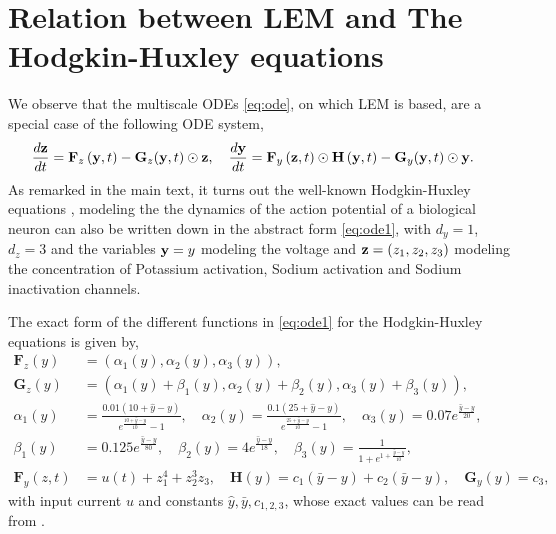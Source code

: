 \documentclass{article} \usepackage{iclr2022_conference,times}
\newcommand{\by}{{\bf y}}
\newcommand{\bz}{{\bf z}}
\begin{document}
\section{Relation between LEM and The Hodgkin-Huxley equations}
\label{app:HH}
We observe that the multiscale ODEs \eqref{eq:ode}, on which LEM is based, are a special case of the following ODE system,
\begin{equation}
    \label{eq:ode1}
    \begin{aligned}
    \frac{d\bz}{dt} &= {\mathbf{F}}_z\left(\by,t\right) - {\mathbf{G}}_z(\by,t)\odot \bz, \quad \frac{d\by}{dt} = {\mathbf{F}}_y\left(\bz,t\right)\odot{\mathbf{H}}\left(\by,t\right) - {\mathbf{G}}_y(\by,t)\odot \by.
    \end{aligned}
\end{equation}
As remarked in the main text, it turns out the well-known Hodgkin-Huxley equations \citet{HH}, modeling the the dynamics of the action potential of a biological neuron can also be written down in the abstract form \eqref{eq:ode1}, with $d_y = 1$, $d_z = 3$ and the variables $\by = y$ modeling the voltage and $\bz = (z_1,z_2,z_3)$ modeling the concentration of Potassium activation, Sodium activation and Sodium inactivation channels. 

The exact form of the different functions in \eqref{eq:ode1} for the Hodgkin-Huxley equations is given by,
\begin{equation}
    \label{eq:HH}
    \begin{aligned}
    {\mathbf{F}}_z(y) &= \left(\alpha_1(y),\alpha_2(y),\alpha_3(y)\right), \\
    {\mathbf{G}}_z(y) &= \left(\alpha_1(y)+\beta_1(y),\alpha_2(y)+\beta_2(y),\alpha_3(y)+\beta_3(y)\right), \\
    \alpha_1(y) &= \frac{0.01(10+\hat{y}-y)}{e^{\frac{10+\hat{y}-y}{10}}-1}, \quad \alpha_2(y) = \frac{0.1(25+\hat{y}-y)}{e^{\frac{25+\hat{y}-y}{10}}-1}, \quad \alpha_3(y) = 0.07e^{\frac{\hat{y}-y}{20}}, \\
    \beta_1(y) &= 0.125e^{\frac{\hat{y}-y}{80}}, \quad \beta_2(y) = 4e^{\frac{\hat{y}-y}{18}}, \quad \beta_3(y) = \frac{1}{1+ e^{1+\frac{\hat{y}-y}{10}}}, \\
    {\mathbf{F}}_y(z,t) &= u(t) + z_1^4 + z_2^3z_3, \quad
    {\mathbf{H}}(y) = c_1(\bar{y}-y) + c_2(\bar{y}-y), \quad {\mathbf{G}}_y(y) = c_3,
    \end{aligned}
\end{equation}
with input current $u$ and constants $\hat{y},\bar{y},c_{1,2,3}$, whose exact values can be read from \citep{HH}. 
\end{document}
